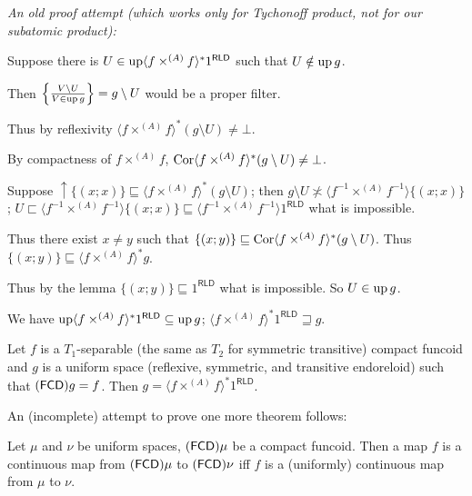 \begin{grayed}
\emph{An old proof attempt (which works only for Tychonoff product, not for our subatomic product):}

Suppose there is $U \in \operatorname{up} \langle f \times^{(A)} f \rangle^{\ast} 1^{\mathsf{RLD}}$
such that $U \notin \operatorname{up} g$.

Then $\left\{ \frac{ V \setminus U }{ V \in \operatorname{up} g }\right\} = g \setminus U$ would be a proper filter.

Thus by reflexivity $\langle f \times^{(A)} f \rangle^{\ast} (g \setminus U) \neq
\bot$.

By compactness of $f \times^{(A)} f$, $\operatorname{Cor} \langle f \times^{(A)} f \rangle^{\ast}
(g \setminus U) \neq \bot$.

Suppose $\uparrow \{ (x ; x) \} \sqsubseteq \langle f \times^{(A)} f \rangle^{\ast}
(g \setminus U)$; then $g \setminus U \nasymp \langle f^{- 1} \times^{(A)} f^{- 1}
\rangle \{ (x ; x) \}$; $U \sqsubset \langle f^{- 1} \times^{(A)} f^{- 1} \rangle \{
(x ; x) \} \sqsubseteq \langle f^{- 1} \times^{(A)} f^{- 1} \rangle 1^{\mathsf{RLD}}$ what is
impossible.

Thus there exist $x \neq y$ such that $\{ (x ; y) \} \sqsubseteq \operatorname{Cor}
\langle f \times^{(A)} f \rangle^{\ast} (g \setminus U)$. Thus $\{ (x ; y) \}
\sqsubseteq \langle f \times^{(A)} f \rangle^{\ast} g$.

Thus by the lemma $\{ (x ; y) \} \sqsubseteq 1^{\mathsf{RLD}}$ what is impossible. So $U
\in \operatorname{up} g$.

We have $\operatorname{up} \langle f \times^{(A)} f \rangle^{\ast} 1^{\mathsf{RLD}} \subseteq
\operatorname{up} g$; $\langle f \times^{(A)} f \rangle^{\ast} 1^{\mathsf{RLD}} \sqsupseteq g$.

\begin{cor}
  Let $f$ is a $T_1$-separable (the same as $T_2$ for symmetric transitive)
  compact funcoid and $g$ is a uniform space (reflexive, symmetric, and
  transitive endoreloid) such that $(\mathsf{FCD}) g = f$. Then $g =
  \langle f \times^{(A)} f \rangle^{\ast} 1^{\mathsf{RLD}}$.
\end{cor}
\end{grayed}


An (incomplete) attempt to prove one more theorem follows:

\begin{thm}
  Let $\mu$ and $\nu$ be uniform spaces, $(\mathsf{FCD})
  \mu$ be a compact funcoid. Then a map $f$ is a continuous map from
  $(\mathsf{FCD}) \mu$ to $(\mathsf{FCD}) \nu$ iff $f$ is
  a (uniformly) continuous map from $\mu$ to $\nu$.
\end{thm}

